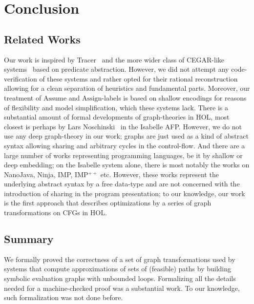 \section{Conclusion}
\subsection{Related Works}
Our work is inspired by Tracer~\cite{DBLP:conf/cav/JaffarMNS12}
and the more wider class of CEGAR-like systems~\cite{DBLP:journals/sttt/BeyerHJM07,DBLP:conf/tacas/ClarkeKSY05,DBLP:conf/cav/IvancicYGGSA05,DBLP:conf/pldi/GrebenshchikovLPR12,McMillan2006}
based on predicate abstraction. However, we did not attempt any
code-verification of these systems and rather opted for their rational
reconstruction allowing for a clean separation of
heuristics and fundamental parts. Moreover, our treatment of 
$\mathrm{Assume}$ and $\mathrm{Assign}$-labels is based on shallow
encodings for reasons of flexibility and model simplification, 
which these systems lack.
  There is a substantial amount of formal developments of graph-theories in HOL,
most closest is perhaps by Lars Noschinski~\cite{Noschinski2015} in the Isabelle AFP. However, we do not use 
any deep graph-theory in our work; graphs are just used as a kind of abstract
syntax allowing sharing and arbitrary cycles in the control-flow.
And there are a large number of works representing programming languages, be 
it by shallow or deep embedding; on the Isabelle system alone, there is most
notably the works on 
NanoJava\cite{Oheimb:2002:HLN:647541.730154}, 
Ninja\cite{DBLP:conf/esop/Lochbihler12}, 
IMP\cite{DBLP:journals/fac/Nipkow98},
IMP$^{++}$\cite{brucker.ea:extensible:2008} etc. 
However, these works represent
the underlying abstract syntax by a free data-type and are not concerned 
with the introduction of sharing in the program presentation; to our knowledge,
our work is the first approach that describes optimizations by a series of
graph transformations on CFGs in HOL.

\subsection{Summary}
We formally proved the correctness of a set of graph
transformations used by systems that compute approximations of sets of
(feasible) paths by building symbolic evaluation graphs with unbounded loops.
Formalizing all the details needed for a
machine\hyp{}checked proof was a substantial work.
To our knowledge, such formalization was not done before. 

